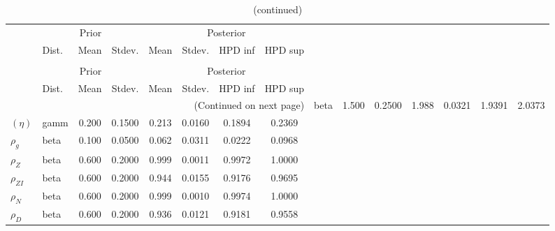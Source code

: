  
\begin{center}
\begin{longtable}{llcccccc} 
\caption{Results from Metropolis-Hastings (parameters)}
 \label{Table:MHPosterior:1}\\
\toprule 
  & \multicolumn{3}{c}{Prior}  &  \multicolumn{4}{c}{Posterior} \\
  \cmidrule(r{.75em}){2-4} \cmidrule(r{.75em}){5-8}
  & Dist. & Mean  & Stdev. & Mean & Stdev. & HPD inf & HPD sup\\
\midrule \endfirsthead 
\caption{(continued)}\\\toprule 
  & \multicolumn{3}{c}{Prior}  &  \multicolumn{4}{c}{Posterior} \\
  \cmidrule(r{.75em}){2-4} \cmidrule(r{.75em}){5-8}
  & Dist. & Mean  & Stdev. & Mean & Stdev. & HPD inf & HPD sup\\
\midrule \endhead 
\bottomrule \multicolumn{8}{r}{(Continued on next page)} \endfoot 
\bottomrule \endlastfoot 
${\gamma}$ & beta &   1.500 & 0.2500 &   1.988& 0.0321 &  1.9391 &  2.0373 \\ 
$(\eta)$ & gamm &   0.200 & 0.1500 &   0.213& 0.0160 &  0.1894 &  0.2369 \\ 
${\rho_g}$ & beta &   0.100 & 0.0500 &   0.062& 0.0311 &  0.0222 &  0.0968 \\ 
${\rho_Z}$ & beta &   0.600 & 0.2000 &   0.999& 0.0011 &  0.9972 &  1.0000 \\ 
${\rho_{ZI}}$ & beta &   0.600 & 0.2000 &   0.944& 0.0155 &  0.9176 &  0.9695 \\ 
${\rho_N}$ & beta &   0.600 & 0.2000 &   0.999& 0.0010 &  0.9974 &  1.0000 \\ 
${\rho_D}$ & beta &   0.600 & 0.2000 &   0.936& 0.0121 &  0.9181 &  0.9558 \\ 
\end{longtable}
 \end{center}
